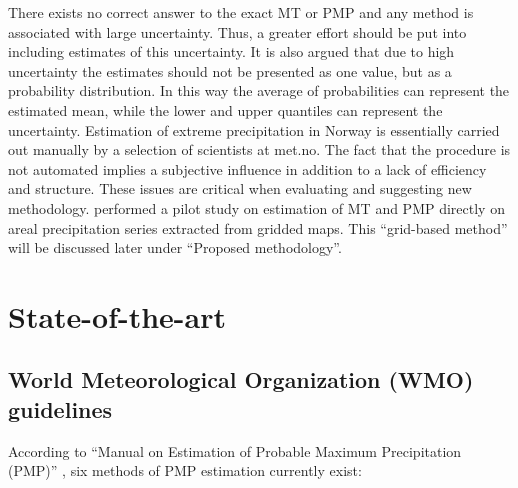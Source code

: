 \documentclass[12pt,a4paper,english]{article}
\begin{document}
There exists no correct answer to the exact MT or PMP and any method is associated with large uncertainty. Thus, a greater effort should be put into including estimates of this uncertainty. It is also argued that due to high uncertainty the estimates should not be presented as one value, but as a probability distribution. In this way the average of probabilities can represent the estimated mean, while the lower and upper quantiles can represent the uncertainty. Estimation of extreme precipitation in Norway is essentially carried out manually by a selection of scientists at met.no. The fact that the procedure is not automated implies a subjective influence in addition to a lack of efficiency and structure. These issues are critical when evaluating and suggesting new methodology. \cite{Alfnes2007} performed a pilot study on estimation of MT and PMP directly on areal precipitation series extracted from gridded maps. This ``grid-based method'' will be discussed later under ``Proposed methodology''.   

\section{State-of-the-art}

\subsection{World Meteorological Organization (WMO) guidelines}

According to ``Manual on Estimation of Probable Maximum Precipitation (PMP)'' \citep{WMO2009a}, six methods of PMP estimation currently exist:
\end{document}
